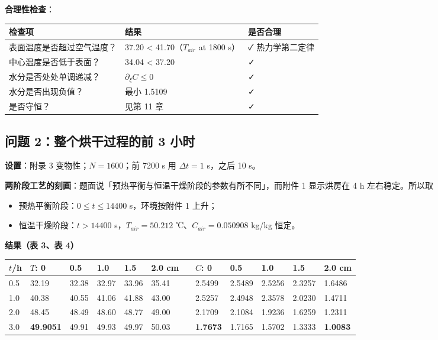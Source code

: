 \textbf{合理性检查}：


\begin{center}
\small
\begin{tabular}{lll}
\toprule
检查项 & 结果 & 是否合理 \\
\midrule
表面温度是否超过空气温度？ & 37.20 < 41.70（$T_{air}$ at 1800 s） & ✓ 热力学第二定律 \\
中心温度是否低于表面？ & 34.04 < 37.20 & ✓ \\
水分是否处处单调递减？ & $\partial_\xi C\le0$ & ✓ \\
水分是否出现负值？ & 最小 1.5109 & ✓ \\
是否守恒？ & 见第 11 章 & ✓ \\
\bottomrule
\end{tabular}
\end{center}


\subsection{问题 2：整个烘干过程的前 3 小时}


\textbf{设置}：附录 3 变物性；$N=1600$；前 7200 s 用 $\Delta t=1$ s，之后 10 s。


\textbf{两阶段工艺的刻画}：题面说「预热平衡与恒温干燥阶段的参数有所不同」，而附件 1 显示烘房在 4 h 左右稳定。所以取


\begin{itemize}
\item 预热平衡阶段：$0\le t\le14400$ s，环境按附件 1 上升；
\item 恒温干燥阶段：$t>14400$ s，$T_{air}=50.212$ ℃、$C_{air}=0.050908$ kg/kg 恒定。
\end{itemize}


\textbf{结果（表 3、表 4）}


\begin{center}
\small
\begin{tabular}{llllllllllll}
\toprule
$t$/h & $T$: 0 & 0.5 & 1.0 & 1.5 & 2.0 cm &  & $C$: 0 & 0.5 & 1.0 & 1.5 & 2.0 cm \\
\midrule
0.5 & 32.19 & 32.38 & 32.97 & 33.96 & 35.41 &  & 2.5499 & 2.5489 & 2.5256 & 2.3257 & 1.6486 \\
1.0 & 40.38 & 40.55 & 41.06 & 41.88 & 43.00 &  & 2.5257 & 2.4948 & 2.3578 & 2.0230 & 1.4711 \\
2.0 & 48.45 & 48.49 & 48.60 & 48.77 & 49.00 &  & 2.1709 & 2.1084 & 1.9236 & 1.6259 & 1.2311 \\
3.0 & \textbf{49.9051} & 49.91 & 49.93 & 49.97 & 50.03 &  & \textbf{1.7673} & 1.7165 & 1.5702 & 1.3333 & \textbf{1.0083} \\
\bottomrule
\end{tabular}
\end{center}


